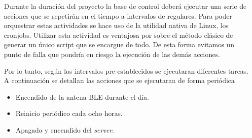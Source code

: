 Durante la duración del proyecto la base de control deberá ejecutar una serie de acciones que se repetirán en el tiempo a intervalos de regulares. Para poder orquestrar estas actividades se hace uso de la utilidad nativa de Linux, los cronjobs. 
Utilizar esta actividad es ventajosa por sobre el método clásico de generar un único script que se encargue de todo. De esta forma evitamos un punto de falla que pondría en riesgo la ejecución de las demás acciones. 


Por lo tanto, según los intervalos pre-establecidos se ejecutaran diferentes tareas. A continuación se detallan las acciones que se ejecutaran de forma periódica  
\begin{itemize}
	\item Encendido de la antena BLE durante el día.
	\item Reinicio periódico cada ocho horas.
	\item Apagado y encendido del \textit{server}. 
\end{itemize}

